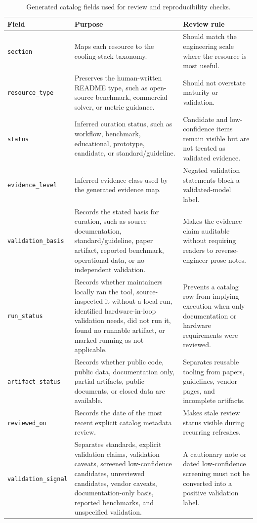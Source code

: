 \documentclass[11pt]{article}
\begin{document}
\begin{table}[t]
\centering
\caption{Generated catalog fields used for review and reproducibility checks.}
\label{tab:data-model}
\begin{tabularx}{\textwidth}{p{}X X}
\toprule
Field & Purpose & Review rule \\
\midrule
\texttt{section} & Maps each resource to the cooling-stack taxonomy. & Should match the engineering scale where the resource is most useful. \\
\addlinespace
\texttt{resource\_type} & Preserves the human-written README type, such as open-source benchmark, commercial solver, or metric guidance. & Should not overstate maturity or validation. \\
\addlinespace
\texttt{status} & Inferred curation status, such as workflow, benchmark, educational, prototype, candidate, or standard/guideline. & Candidate and low-confidence items remain visible but are not treated as validated evidence. \\
\addlinespace
\texttt{evidence\_level} & Inferred evidence class used by the generated evidence map. & Negated validation statements block a validated-model label. \\
\addlinespace
\texttt{validation\_basis} & Records the stated basis for curation, such as source documentation, standard/guideline, paper artifact, reported benchmark, operational data, or no independent validation. & Makes the evidence claim auditable without requiring readers to reverse-engineer prose notes. \\
\addlinespace
\texttt{run\_status} & Records whether maintainers locally ran the tool, source-inspected it without a local run, identified hardware-in-loop validation needs, did not run it, found no runnable artifact, or marked running as not applicable. & Prevents a catalog row from implying execution when only documentation or hardware requirements were reviewed. \\
\addlinespace
\texttt{artifact\_status} & Records whether public code, public data, documentation only, partial artifacts, public documents, or closed data are available. & Separates reusable tooling from papers, guidelines, vendor pages, and incomplete artifacts. \\
\addlinespace
\texttt{reviewed\_on} & Records the date of the most recent explicit catalog metadata review. & Makes stale review status visible during recurring refreshes. \\
\addlinespace
\texttt{validation\_signal} & Separates standards, explicit validation claims, validation caveats, screened low-confidence candidates, unreviewed candidates, vendor caveats, documentation-only basis, reported benchmarks, and unspecified validation. & A cautionary note or dated low-confidence screening must not be converted into a positive validation label. \\

\end{tabularx}
\end{table}
\end{document}

